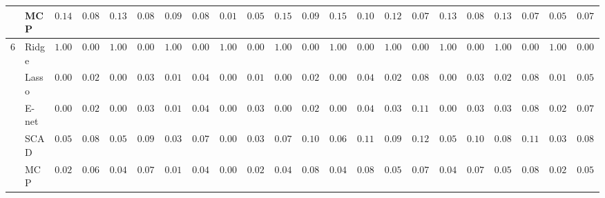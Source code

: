\begin{tabular}{p{0.2cm}p{1cm}|p{0.6cm}p{0.6cm}|p{0.6cm}p{0.6cm}p{0.6cm}p{0.6cm}p{0.6cm}p{0.6cm}|p{0.6cm}p{0.6cm}p{0.6cm}p{0.6cm}p{0.6cm}p{0.6cm}|p{0.6cm}p{0.6cm}p{0.6cm}p{0.6cm}p{0.6cm}p{0.6cm}}
 & MCP  & $0.1417$ & $0.0833$ & $0.1383$ & $0.0856$ & $0.0917$ & $0.0866$ & $0.0183$ & $0.0524$ & $0.1500$ & $0.0902$ & $0.1517$ & $0.1008$ & $0.1250$ & $0.0763$ & $0.1333$ & $0.0821$ & $0.1367$ & $0.0799$ & $0.0517$ & $0.0775$ \\\hline
6 & Ridge  & $1.0000$ & $0.0000$ & $1.0000$ & $0.0000$ & $1.0000$ & $0.0000$ & $1.0000$ & $0.0000$ & $1.0000$ & $0.0000$ & $1.0000$ & $0.0000$ & $1.0000$ & $0.0000$ & $1.0000$ & $0.0000$ & $1.0000$ & $0.0000$ & $1.0000$ & $0.0000$ \\
 & Lasso  & $0.0033$ & $0.0235$ & $0.0067$ & $0.0328$ & $0.0100$ & $0.0463$ & $0.0017$ & $0.0167$ & $0.0050$ & $0.0286$ & $0.0083$ & $0.0435$ & $0.0267$ & $0.0877$ & $0.0083$ & $0.0365$ & $0.0283$ & $0.0822$ & $0.0133$ & $0.0512$ \\
 & E-net  & $0.0033$ & $0.0235$ & $0.0067$ & $0.0328$ & $0.0117$ & $0.0489$ & $0.0067$ & $0.0328$ & $0.0050$ & $0.0286$ & $0.0067$ & $0.0405$ & $0.0333$ & $0.1111$ & $0.0083$ & $0.0365$ & $0.0300$ & $0.0834$ & $0.0200$ & $0.0722$ \\
 & SCAD  & $0.0500$ & $0.0838$ & $0.0567$ & $0.0924$ & $0.0333$ & $0.0786$ & $0.0067$ & $0.0328$ & $0.0700$ & $0.1037$ & $0.0650$ & $0.1108$ & $0.0967$ & $0.1235$ & $0.0583$ & $0.1015$ & $0.0833$ & $0.1148$ & $0.0333$ & $0.0821$ \\
 & MCP  & $0.0267$ & $0.0614$ & $0.0417$ & $0.0763$ & $0.0150$ & $0.0479$ & $0.0033$ & $0.0235$ & $0.0400$ & $0.0825$ & $0.0483$ & $0.0896$ & $0.0567$ & $0.0793$ & $0.0400$ & $0.0754$ & $0.0533$ & $0.0883$ & $0.0200$ & $0.0544$ \\
\hline 
\end{tabular}

